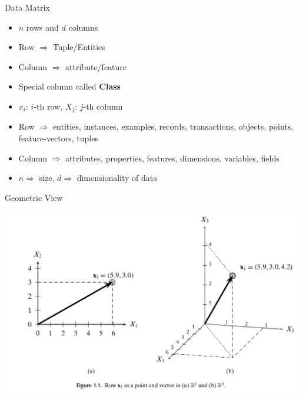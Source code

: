 \documentclass{beamer}
\begin{document}
\begin{frame}{Data Matrix}                                                                                              
    \begin{itemize}                                                                                                          
        \item $n$ rows and $d$ columns 
        \item Row $\Rightarrow$ Tuple/Entities
        \item Column $\Rightarrow$ attribute/feature
        \item Special column called {\bf Class}
        \item $x_i$: $i$-th row, $X_j$: $j$-th column
        \item Row $\Rightarrow$ entities, instances, examples, records, transactions, objects, points, feature-vectors, tuples
        \item Column $\Rightarrow$ attributes, properties, features, dimensions, variables, fields
        \item $n \Rightarrow$ size, $d \Rightarrow$ dimensionality of data
    \end{itemize}                                                                                                            
\end{frame}   

\begin{frame}{Geometric View}
    \begin{center}                                                                                                           
        \includegraphics[scale=0.25]{geometricView.png}                                                                    
    \end{center}                                                                                                             
\end{frame}   
\end{document}
